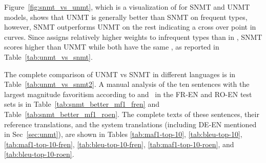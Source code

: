 Figure~\ref{fig:snmt_vs_unmt}, which is a visualization of  for SNMT and UNMT models,  shows that UNMT is generally better than SNMT on frequent types, however, SNMT outperforms UNMT on the rest indicating a cross over point in  curves. 
Since  assigns relatively higher weights to infrequent types than in \bleu{}, SNMT scores higher  than UNMT while both have the same \bleu{}, as reported in Table~\ref{tab:unmt_vs_snmt}.

The complete comparison of UNMT vs SNMT in different languages is in Table~\ref{tab:unmt_vs_snmt2}. A manual analysis of the ten sentences with the largest magnitude favoritism according to  and \bleu\ in the FR-EN and RO-EN test sets is in Table~\ref{tab:snmt_better_mf1_fren} and Table~\ref{tab:snmt_better_mf1_roen}. The complete texts of these sentences, their reference translations, and the system translations (including DE-EN mentioned in Sec~\ref{sec:unmt}), are shown in Tables \ref{tab:maf1-top-10}, \ref{tab:bleu-top-10}, \ref{tab:maf1-top-10-fren}, \ref{tab:bleu-top-10-fren}, \ref{tab:maf1-top-10-roen}, and \ref{tab:bleu-top-10-roen}. 


\label{app:extraqual}

